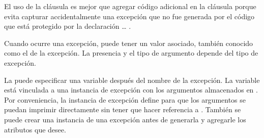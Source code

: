 \documentclass[a5paper,10pt,spanish]{sphinxmanual}
\begin{document}
\sphinxAtStartPar
El uso de la cláusula  es mejor que agregar código adicional en la cláusula  porque evita capturar accidentalmente una excepción que no fue generada por el código que está protegido por la declaración  … .

\sphinxAtStartPar
Cuando ocurre una excepción, puede tener un valor asociado, también conocido como el  de la excepción.  La presencia y el tipo de argumento depende del tipo de excepción.

\sphinxAtStartPar
La  puede especificar una variable después del nombre de la excepción. La variable está vinculada a una instancia de excepción con los argumentos almacenados en . Por conveniencia, la instancia de excepción define  para que los argumentos se puedan imprimir directamente sin tener que hacer referencia a . También se puede crear una instancia de una excepción antes de generarla y agregarle los atributos que desee.

\begin{sphinxVerbatim}[commandchars=\\\{\}]
      
   
        
         
              
                         
            
     
     
\end{sphinxVerbatim}
\end{document}
